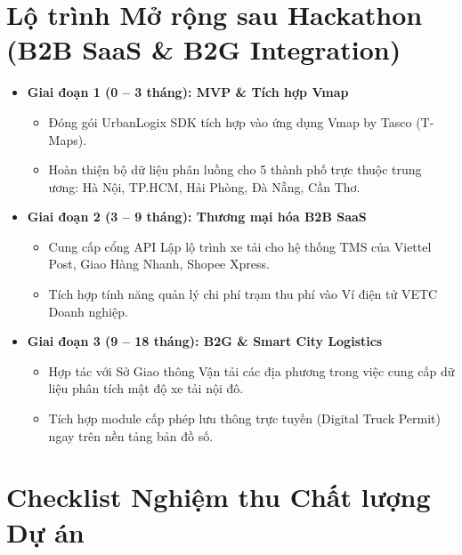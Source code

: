 \documentclass[11pt,a4paper]{article}
\begin{document}
\section{Lộ trình Mở rộng sau Hackathon (B2B SaaS \& B2G Integration)}

\begin{itemize}
  \item \textbf{Giai đoạn 1 (0 -- 3 tháng): MVP \& Tích hợp Vmap}
  \begin{itemize}
    \item Đóng gói UrbanLogix SDK tích hợp vào ứng dụng Vmap by Tasco (T-Maps).
    \item Hoàn thiện bộ dữ liệu phân luồng cho 5 thành phố trực thuộc trung ương: Hà Nội, TP.HCM, Hải Phòng, Đà Nẵng, Cần Thơ.
  \end{itemize}
  \item \textbf{Giai đoạn 2 (3 -- 9 tháng): Thương mại hóa B2B SaaS}
  \begin{itemize}
    \item Cung cấp cổng API Lập lộ trình xe tải cho hệ thống TMS của Viettel Post, Giao Hàng Nhanh, Shopee Xpress.
    \item Tích hợp tính năng quản lý chi phí trạm thu phí vào Ví điện tử VETC Doanh nghiệp.
  \end{itemize}
  \item \textbf{Giai đoạn 3 (9 -- 18 tháng): B2G \& Smart City Logistics}
  \begin{itemize}
    \item Hợp tác với Sở Giao thông Vận tải các địa phương trong việc cung cấp dữ liệu phân tích mật độ xe tải nội đô.
    \item Tích hợp module cấp phép lưu thông trực tuyến (Digital Truck Permit) ngay trên nền tảng bản đồ số.
  \end{itemize}
\end{itemize}

\section{Checklist Nghiệm thu Chất lượng Dự án}
\end{document}
